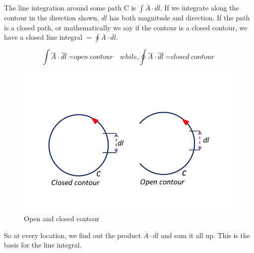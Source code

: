The line integration around some path C is ${\displaystyle \int  \overline{A} \cdot \overline{dl}}$. If we integrate along the contour in the direction shown, $dl$ has both magnitude and direction. If the path is a closed path, or mathematically we say if the contour is a closed contour, we have a closed line integral $= {\displaystyle \oint  \overline{A} \cdot \overline{dl}}$.

\begin{equation}
{\displaystyle \int  \overline{A} \cdot \overline{dl} = }open\; contour\quad while, \newline  {\displaystyle \oint  \overline{A} \cdot \overline{dl}= }closed\; contour
\end{equation}
\begin{figure}
	\centering
	\includegraphics[width=0.9\linewidth]{./graphics/fig17.4}
	\caption{Open and closed contour}
\end{figure}

So at every location, we find out the product $\overline{A} \cdot \overline{dl}$ and sum it all up. This is the basis for the line integral.
